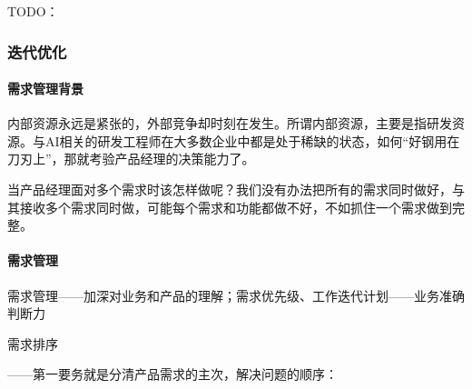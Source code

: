 \documentclass[letterpaper,11pt,english]{sphinxmanual}
\begin{document}
TODO：


\subsubsection{迭代优化}
\label{\detokenize{chapter_skill/upgrade_manage:id1}}\label{\detokenize{chapter_skill/upgrade_manage::doc}}

\paragraph{需求管理背景}
\label{\detokenize{chapter_skill/upgrade_manage:id2}}
内部资源永远是紧张的，外部竞争却时刻在发生。所谓内部资源，主要是指研发资源。与AI相关的研发工程师在大多数企业中都是处于稀缺的状态，如何“好钢用在刀刃上”，那就考验产品经理的决策能力了。

当产品经理面对多个需求时该怎样做呢？我们没有办法把所有的需求同时做好，与其接收多个需求同时做，可能每个需求和功能都做不好，不如抓住一个需求做到完整。


\paragraph{需求管理}
\label{\detokenize{chapter_skill/upgrade_manage:id3}}
需求管理——加深对业务和产品的理解；需求优先级、工作迭代计划——业务准确判断力

需求排序%
\begin{footnote}[191]\sphinxAtStartFootnote
{}
%
\end{footnote}——第一要务就是分清产品需求的主次，解决问题的顺序：
\end{document}
